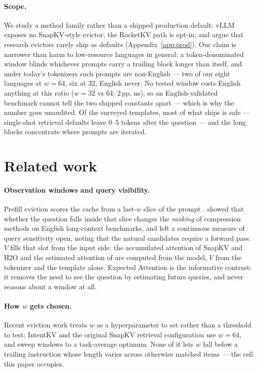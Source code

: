 \documentclass{article}
\begin{document}
\paragraph{Scope.}
We study a method family rather than a shipped production default: vLLM
exposes no SnapKV-style evictor, the RocketKV path is opt-in, and
\citet{nvidia2026efficient} argue that research evictors rarely ship as
defaults (Appendix~\ref{app:prod}). Our claim is narrower than harm to
low-resource languages in general:
a token-denominated window blinds whichever prompts carry a trailing
block longer than itself, and under today's tokenizers such prompts are
non-English --- two of our eight languages at $w{=}64$, six at 32,
English never. No tested window costs English anything at this ratio
($w{=}32$ vs $64$: $2$\,pp, ns), so an English-validated benchmark
cannot tell the two shipped constants apart --- which is why the number
goes unaudited. Of the surveyed templates, most of what ships is safe
--- single-shot retrieval defaults leave 0--5 tokens after the question
--- and the long blocks concentrate where prompts are iterated.

\section{Related work}
\label{sec:related}

\paragraph{Observation windows and query visibility.}
Prefill eviction scores the cache from a last-$w$ slice of the prompt
\citep{li2024snapkv}. \citet{luo2026visibility} showed that whether the
question falls inside that slice changes the \emph{ranking} of
compression methods on English long-context benchmarks, and left a
continuous measure of query sensitivity open, noting that the natural
candidates require a forward pass. $V$
fills that slot from the input side: the accumulated attention of SnapKV
and H2O \citep{zhang2023h2o} and the estimated attention of
\citet{devoto2025expected} are computed
from the model, $V$ from the tokenizer and the template alone.
Expected Attention is the informative contrast: it removes the need to
see the question by estimating future queries, and never reasons about
a window at all.

\paragraph{How $w$ gets chosen.}
Recent eviction work treats $w$ as a hyperparameter to set rather than
a threshold to test: IntentKV \citep{zhao2026intentkv} and the original
SnapKV retrieval configuration use $w{=}64$, and
\citet{nawrot2026findings} sweep windows to a task-average optimum.
None of it lets $w$ fall below a trailing instruction whose length
varies across otherwise matched items --- the cell this paper occupies.
\end{document}
